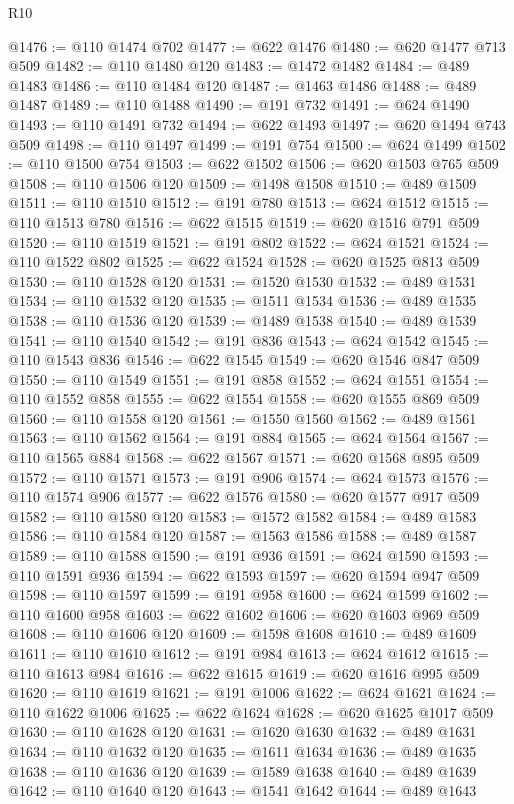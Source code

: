 \begin{lexlean}{R10}
\begin{coremodule}
@1476 := @110 @1474 @702
@1477 := @622 @1476
@1480 := @620 @1477 @713 @509
@1482 := @110 @1480 @120
@1483 := @1472 @1482
@1484 := @489 @1483
@1486 := @110 @1484 @120
@1487 := @1463 @1486
@1488 := @489 @1487
@1489 := @110 @1488
@1490 := @191 @732
@1491 := @624 @1490
@1493 := @110 @1491 @732
@1494 := @622 @1493
@1497 := @620 @1494 @743 @509
@1498 := @110 @1497
@1499 := @191 @754
@1500 := @624 @1499
@1502 := @110 @1500 @754
@1503 := @622 @1502
@1506 := @620 @1503 @765 @509
@1508 := @110 @1506 @120
@1509 := @1498 @1508
@1510 := @489 @1509
@1511 := @110 @1510
@1512 := @191 @780
@1513 := @624 @1512
@1515 := @110 @1513 @780
@1516 := @622 @1515
@1519 := @620 @1516 @791 @509
@1520 := @110 @1519
@1521 := @191 @802
@1522 := @624 @1521
@1524 := @110 @1522 @802
@1525 := @622 @1524
@1528 := @620 @1525 @813 @509
@1530 := @110 @1528 @120
@1531 := @1520 @1530
@1532 := @489 @1531
@1534 := @110 @1532 @120
@1535 := @1511 @1534
@1536 := @489 @1535
@1538 := @110 @1536 @120
@1539 := @1489 @1538
@1540 := @489 @1539
@1541 := @110 @1540
@1542 := @191 @836
@1543 := @624 @1542
@1545 := @110 @1543 @836
@1546 := @622 @1545
@1549 := @620 @1546 @847 @509
@1550 := @110 @1549
@1551 := @191 @858
@1552 := @624 @1551
@1554 := @110 @1552 @858
@1555 := @622 @1554
@1558 := @620 @1555 @869 @509
@1560 := @110 @1558 @120
@1561 := @1550 @1560
@1562 := @489 @1561
@1563 := @110 @1562
@1564 := @191 @884
@1565 := @624 @1564
@1567 := @110 @1565 @884
@1568 := @622 @1567
@1571 := @620 @1568 @895 @509
@1572 := @110 @1571
@1573 := @191 @906
@1574 := @624 @1573
@1576 := @110 @1574 @906
@1577 := @622 @1576
@1580 := @620 @1577 @917 @509
@1582 := @110 @1580 @120
@1583 := @1572 @1582
@1584 := @489 @1583
@1586 := @110 @1584 @120
@1587 := @1563 @1586
@1588 := @489 @1587
@1589 := @110 @1588
@1590 := @191 @936
@1591 := @624 @1590
@1593 := @110 @1591 @936
@1594 := @622 @1593
@1597 := @620 @1594 @947 @509
@1598 := @110 @1597
@1599 := @191 @958
@1600 := @624 @1599
@1602 := @110 @1600 @958
@1603 := @622 @1602
@1606 := @620 @1603 @969 @509
@1608 := @110 @1606 @120
@1609 := @1598 @1608
@1610 := @489 @1609
@1611 := @110 @1610
@1612 := @191 @984
@1613 := @624 @1612
@1615 := @110 @1613 @984
@1616 := @622 @1615
@1619 := @620 @1616 @995 @509
@1620 := @110 @1619
@1621 := @191 @1006
@1622 := @624 @1621
@1624 := @110 @1622 @1006
@1625 := @622 @1624
@1628 := @620 @1625 @1017 @509
@1630 := @110 @1628 @120
@1631 := @1620 @1630
@1632 := @489 @1631
@1634 := @110 @1632 @120
@1635 := @1611 @1634
@1636 := @489 @1635
@1638 := @110 @1636 @120
@1639 := @1589 @1638
@1640 := @489 @1639
@1642 := @110 @1640 @120
@1643 := @1541 @1642
@1644 := @489 @1643

\end{coremodule}
\end{lexlean}
